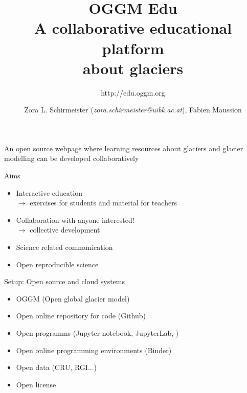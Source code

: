 \documentclass[final]{beamer}
\title{OGGM Edu \\ \vspace{1cm} A collaborative educational platform \\ about glaciers}
\subtitle{http://edu.oggm.org}
\author{Zora L. Schirmeister (\textit{zora.schirmeister@uibk.ac.at}), Fabien Maussion}
\begin{document}
\begin{frame}[fragile]

\vspace*{-14cm}
\vspace*{3cm}

\centering
		\begin{boxblock}{}
						{\large \color{uibkblue} An open source webpage where learning resources about glaciers and glacier modelling can be developed collaboratively}
		\end{boxblock}

\vspace*{0.5cm}

	\begin{minipage}[t]{36cm}
		\vspace{0pt}
		\begin{boxblock}{Aims}
				\begin{itemize}
						\item Interactive education \\$\rightarrow$ exercises for students and material for teachers
						\item Collaboration with anyone interested! \\$\rightarrow$ collective development
						\item Science related communication
						\item Open reproducible science
				\end{itemize}
		\end{boxblock}
	\end{minipage}
\hspace*{7.15cm}
	\begin{minipage}[t]{36cm}
		\vspace{0pt}
		\begin{boxblock}{Setup: Open source and cloud systems}
				\begin{itemize}
						\item OGGM (Open global glacier model)
						\item Open online repository for code (Github)
						\item Open programms (Jupyter notebook, JupyterLab, )
						\item Open online programming environments (Binder)
						\item Open data (CRU, RGI...)
						\item Open license
				\end{itemize}
		\end{boxblock}
	\end{minipage}


\end{frame}
\end{document}
